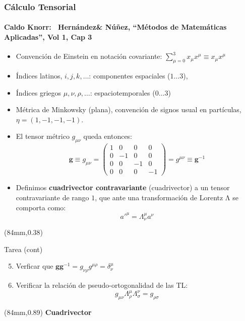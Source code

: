 \documentclass[xetex,mathserif,serif,10pt]{beamer}
\begin{document}
\begin{frame}
	\frametitle{Cálculo Tensorial}
  \framesubtitle{Caldo Knorr\textregistered:~ Hernández\& Núñez, ``Métodos de Matemáticas Aplicadas'', Vol 1, Cap 3}
  \begin{itemize}
    \item Convención de Einstein en notación covariante: $\sum_{\mu=0}^3 x_\mu x^\mu \equiv x_\mu x^\mu$
    \item Índices latinos, $i,j,k,\ldots$: componentes espaciales ($1\ldots 3$),
    \item Índices griegos $\mu, \nu, \rho, \ldots$: espaciotemporales ($0\ldots 3$)
    \item Métrica de Minkowsky (plana), convención de signos usual en partículas, $\eta=(1,-1,-1,-1)$.
    \item El tensor métrico $g_{\mu\nu}$ queda entonces:
      \begin{equation}\label{EQmetrica}
        \mathbf{g} \equiv g_{\mu\nu} = \left ( 
          \begin{array}{cccc}
            1 & 0 & 0 & 0 \\
            0 & -1 & 0 & 0 \\
            0 & 0 & -1 & 0 \\
            0 & 0 & 0 & -1
          \end{array}
          \right ) = g^{\mu\nu}\equiv \mathbf{g}^{-1}
      \end{equation}
    \item Definimos {\bf{cuadrivector contravariante}} (cuadrivector) a un \alert{tensor contravariante de rango $1$}, que ante una transformación de Lorentz Λ se comporta como:
      \begin{equation}
        a'^\mu = \Lambda^{\mu}_{\nu} a^\nu
      \end{equation}
  \end{itemize}
  \begin{textblock*}{41mm}(84mm,0.38\textheight)
    \tiny 
    {
      \begin{exampleblock}{\tiny{Tarea (cont)}}
        \begin{enumerate}\setcounter{enumi}{04}
          \item Verficar que $\mathbf{g}\mathbf{g}^{-1} = g_{\nu\rho} g^{\mu\rho} = \delta^\mu_\nu$
          \item Verificar la relación de pseudo-ortogonalidad de las TL: \vspace{-2em}  
           \begin{equation}\label{EQorto}
             g_{\mu\nu} \Lambda^{\mu}_{\rho} \Lambda^{\nu}_{\sigma} = g_{\rho\sigma}
           \end{equation}\vspace{-3em}  
        \end{enumerate}
      \end{exampleblock}
    }
  \end{textblock*}
  \begin{textblock*}{41mm}(84mm,0.89\textheight)
    \Large{\alert{\bf{Cuadrivector}}}
  \end{textblock*}
\end{frame}
\end{document}
